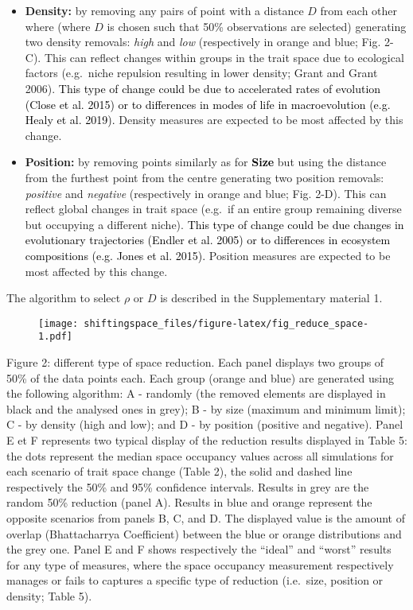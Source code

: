 \documentclass[]{article}
\begin{document}
\begin{itemize}
\item
  \textbf{Density:} by removing any pairs of point with a distance \(D\)
  from each other where (where \(D\) is chosen such that 50\%
  observations are selected) generating two density removals:
  \emph{high} and \emph{low} (respectively in orange and blue; Fig.
  2-C). This can reflect changes within groups in the trait space due to
  ecological factors (e.g.~niche repulsion resulting in lower density;
  Grant and Grant 2006). \textcolor{black}{This type of
  change could be due to accelerated rates of evolution (Close et al.
  2015) or to differences in modes of life in macroevolution (e.g. Healy
  et al. 2019).} Density measures are expected to be most affected by
  this change.
\item
  \textbf{Position:} by removing points similarly as for
  \textbf{\textcolor{black}{Size}} but using the
  distance from the furthest point from the centre generating two
  position removals: \emph{positive} and \emph{negative} (respectively
  in orange and blue; Fig. 2-D). This can reflect global changes in
  trait space (e.g.~if an entire group remaining diverse but occupying a
  different niche). \textcolor{black}{This type of
  change could be due changes in evolutionary trajectories (Endler et
  al. 2005) or to differences in ecosystem compositions (e.g. Jones et
  al. 2015).} Position measures are expected to be most affected by
  this change.
\end{itemize}

The algorithm to select \(\rho\) or \(D\) is described in the
Supplementary material 1.

\renewcommand\baselinestretch{1}\selectfont

\begin{figure}
\centering
\texttt{[image: shiftingspace\_files/figure-latex/fig\_reduce\_space-1.pdf]}
\caption{}
\end{figure}

Figure 2: different type of space reduction. Each panel displays two
groups of 50\% of the data points each. Each group (orange and blue) are
generated using the following algorithm: A - randomly (the removed
elements are displayed in black and the analysed ones in grey); B - by
size (maximum and minimum limit); C - by density (high and low); and D -
by position (positive and negative). Panel E et F represents two typical
display of the reduction results displayed in Table 5: the dots
represent the median space occupancy values across all simulations for
each scenario of trait space change (Table 2), the solid and dashed line
respectively the 50\% and 95\% confidence intervals. Results in grey are
the random 50\% reduction (panel A). Results in blue and orange
represent the opposite scenarios from panels B, C, and D. The displayed
value is the amount of overlap (Bhattacharrya Coefficient) between the
blue or orange distributions and the grey one. Panel E and F shows
respectively the ``ideal'' and ``worst'' results for any type of
measures, where the space occupancy measurement respectively manages or
fails to captures a specific type of reduction (i.e.~size, position or
density; Table 5).
\end{document}
